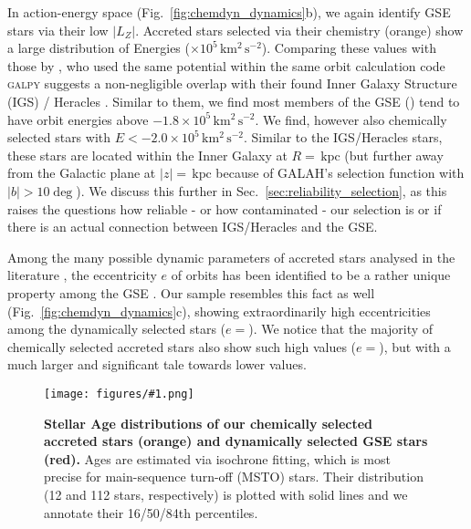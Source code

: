 \documentclass[fleqn,usenatbib]{mnras}
\newcommand{\kpc}{\,\mathrm{kpc}}	%
\newcommand{\kmkmss}{\,\mathrm{km^2\,s^{-2}}}	%
\newcommand{\codeicon}{{\faCloudDownload}}
\newcommand{\codelink}[1]{\href{https://github.com/svenbuder/buder_galah_accreted_chemistry/tree/main/figures/#1.ipynb}{\codeicon}\,\,}
\newcommand{\oscaption}[2]{\caption{#2 \codelink{#1}}}
\newcommand{\figurecolumnwidth}[3]{\begin{figure} \centering \texttt{[image: figures/\#1.png]}\oscaption{#2}{#3}\label{fig:#1} \end{figure}}
\begin{document}
In action-energy space (Fig.~\ref{fig:chemdyn_dynamics}b), we again identify GSE stars via their low $\vert L_Z \vert$. Accreted stars selected via their chemistry (orange) show a large distribution of Energies ($ \times 10^5 \kmkmss$). Comparing these values with those by \citet{Horta2021}, who used the same potential \citep{McMillan2017} within the same orbit calculation code \textsc{galpy} \citep{Bovy2015, Mackereth2018} suggests a non-negligible overlap with their found Inner Galaxy Structure (IGS) / Heracles \citep{Horta2021}. Similar to them, we find most members of the GSE () tend to have orbit energies  above $-1.8 \times 10^5 \kmkmss$. We find, however also  chemically selected stars with $E < -2.0 \times 10^5 \kmkmss$. Similar to the IGS/Heracles stars, these stars are located within the Inner Galaxy at $R = $$ \kpc$ (but further away from the Galactic plane at $\vert z \vert =$$\kpc$ because of GALAH's selection function with $\vert b \vert > 10\deg$). We discuss this further in Sec.~\ref{sec:reliability_selection}, as this raises the questions how reliable - or how contaminated - our selection is or if there is an actual connection between IGS/Heracles and the GSE.

Among the many possible dynamic parameters of accreted stars analysed in the literature \citep[e.g.][]{Schuster2012}, the eccentricity $e$ of orbits has been identified to be a rather unique property among the GSE \citep{Mackereth2019, Naidu2020}. Our sample resembles this fact as well (Fig.~\ref{fig:chemdyn_dynamics}c), showing extraordinarily high eccentricities among the dynamically selected stars ($e=$). We notice that the majority of chemically selected accreted stars also show such high values ($e=$), but with a much larger and significant tale towards lower values.

\figurecolumnwidth{age_histogram}{stellar_ages}{
\textbf{Stellar Age distributions of our chemically selected accreted stars (orange) and dynamically selected GSE stars (red).} Ages are estimated via isochrone fitting, which is most precise for main-sequence turn-off (MSTO) stars. Their distribution (12 and 112 stars, respectively) is plotted with solid lines and we annotate their 16/50/84th percentiles.
}
\end{document}
